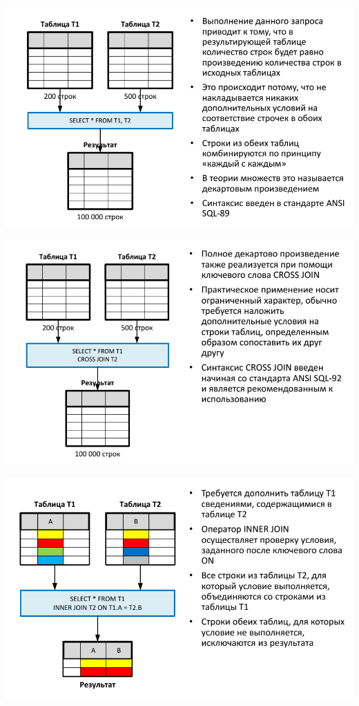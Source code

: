 \documentclass{beamer}
\begin{document}
\begin{frame}
	\begin{center}
		\includegraphics[scale=0.5]{images/cs-01.png}
	\end{center}
\end{frame} 

\begin{frame}
	\begin{center}
		\includegraphics[scale=0.5]{images/cs-02.png}
	\end{center}
\end{frame} 

\begin{frame}
	\begin{center}
		\includegraphics[scale=0.5]{images/cs-03.png}
	\end{center}
\end{frame} 
\end{document}
